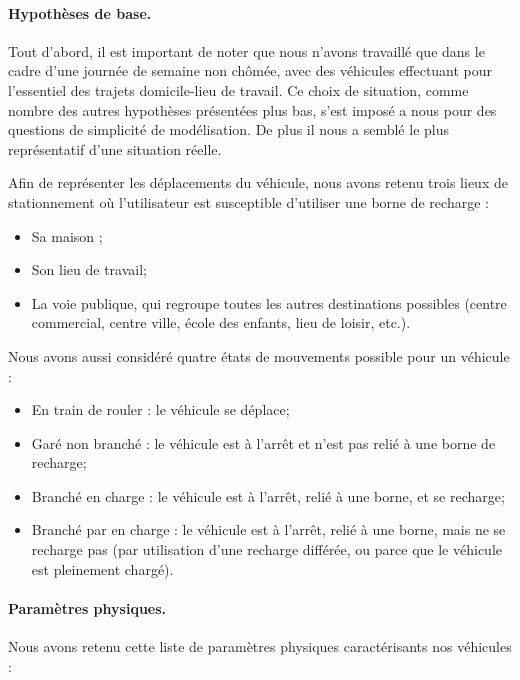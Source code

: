 \documentclass[10pt]{article}
\begin{document}
		\paragraph{Hypothèses de base.}
		Tout d'abord, il est important de noter que nous n'avons travaillé que dans le cadre d'une journée de semaine non chômée, avec des véhicules effectuant pour l'essentiel des trajets domicile-lieu de travail. Ce choix de situation, comme nombre des autres hypothèses présentées plus bas, s'est imposé a nous pour des questions de simplicité de modélisation. De plus il nous a semblé le plus représentatif d'une situation réelle.
		
		Afin de représenter les déplacements du véhicule, nous avons retenu trois lieux de stationnement où l'utilisateur est susceptible d'utiliser une borne de recharge :
		\begin{itemize}
			\item Sa maison ;
			\item Son lieu de travail;
			\item La voie publique, qui regroupe toutes les autres destinations possibles (centre commercial, centre ville, école des enfants, lieu de loisir, etc.).
		\end{itemize}
		
		Nous avons aussi considéré quatre états de mouvements possible pour un véhicule : 
		\begin{itemize}
			\item En train de rouler : le véhicule se déplace;
			\item Garé non branché  : le véhicule est à l'arrêt et n'est pas relié à une borne de recharge;
			\item Branché en charge  : le véhicule est à l'arrêt, relié à une borne, et se recharge;
			\item Branché par en charge : le véhicule est à l'arrêt, relié à une borne, mais ne se recharge pas (par utilisation d'une recharge différée, ou parce que le véhicule est pleinement chargé).
		\end{itemize}
		
		
		\paragraph{Paramètres physiques.} Nous avons retenu cette liste de paramètres physiques caractérisants nos véhicules :
		
\end{document}
